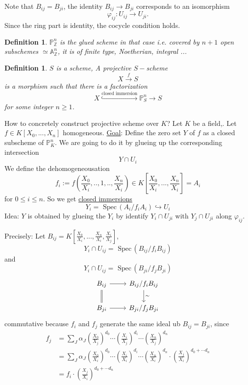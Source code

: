 \documentclass[11pt]{article}
\newtheorem{dfn}[thm]{Definition}
\newcommand{\spec}{\text{ Spec}\,}
\newcommand{\affn}{\mathbb A}
\newcommand{\proj}{\mathbb P}
\newcommand{\intg}{\mathbb Z}
\newcommand{\lrta}{\longrightarrow}
\newcommand{\inj}{\hookrightarrow}
\begin{document}
Note that $B_{ij}=B_{ji}$, the identity $B_{ij}\lrta B_{ji}$ corresponds to an isomorphism 
$$
\varphi_{ij}:U_{ij}\lrta U_{ji}.
$$
Since the ring part is identity, the cocycle condition holds.
\begin{dfn}
$\proj^n_\intg$ is the glued scheme in that case
i.e. covered by $n+1$ open subschemes $\simeq \affn^n_\intg$, it is of finite type, Noetherian, integral ...
\end{dfn}
\begin{dfn}
$S$ is a  scheme, A projective $S-$scheme
$$
X\overset{f}{\lrta} S
$$
is a morphism such that there is a factorization
$$
X\overset{\text{closed immersion}}\inj \proj^n_S\lrta S
$$
for some integer $n\geq 1$.
\end{dfn}

How to concretely construct projective scheme over $K$? Let $K$ be a field,. Let $f\in K[X_0,...,X_n]$ homogeneous. \underline{Goal}: Define the zero set $Y$ of $f$ as a  closed subscheme of $\proj^n_K$. We are going to do it by glueing up the corresponding intersection
$$
Y\cap U_i
$$
We define the dehomogeneousation 
$$
f_i:=f\left(\frac{X_0}{X_i},..,1,..,\frac{X_n}{X_i}\right)\in K[\frac{X_0}{X_i},...,\frac{X_n}{X_i}]=A_i
$$
for $0\leq i\leq n$.
So we get \underline{closed immersions}
$$
Y_i=\spec(A_i/f_i A_i)\inj U_i
$$
Idea: $Y$ is obtained by glueing the $Y_i$ by identify $Y_i\cap U_{ji}$ with $Y_j\cap U_{ji}$ along $\varphi_{ij}$.

Precisely: Let $B_{ij}=K[\frac{X_0}{X_i},...,\frac{X_n}{X_i},\frac{X_i}{X_j}]$,
$$
Y_i\cap U_{ij}=\spec(B_{ij}/f_i B_{ij})
$$
and
$$
Y_i\cap U_{ij}=\spec(B_{ji}/f_j B_{ji})
$$
$$
\begin{tikzcd}
B_{ij} \arrow[r] \arrow[d, equal] & B_{ij}/f_iB_{ij} \arrow[d, "\sim"] \\
B_{ji} \arrow[r] & B_{ji}/f_jB_{ji}
\end{tikzcd}
$$
commutative because $f_i$ and $f_j$ generate the same ideal ub $B_{ij}=B_{ji}$, since
$$
\begin{aligned}
f_j &=\sum_J \alpha_J \left(\frac{X_0}{X_j}\right)^{d_0}\cdots\left(\frac{X_i}{X_j}\right)^{d_i}\cdots \left(\frac{X_n}{X_j}\right)^{d_n}\\
&=\sum_J \alpha_J \left(\frac{X_0}{X_i}\right)^{d_0}\cdots\left(\frac{X_i}{X_i}\right)^{d_i}\cdots \left(\frac{X_n}{X_i}\right)^{d_n}\cdot \left(\frac{X_j}{X_i}\right)^{d_0+\cdots d_n}\\
&= f_i \cdot \left(\frac{X_j}{X_i}\right)^{d_0+\cdots d_n}
\end{aligned}
$$
\end{document}
